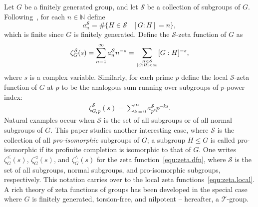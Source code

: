 \documentclass[11pt,a4paper]{amsart}
\theoremstyle{plain}
\theoremstyle{remark}
\newcommand{\N}{\mathbb{N}}
\begin{document}
Let $G$ be a finitely generated group, and let $\mathcal{S}$ be a collection of subgroups of $G$.  Following~\cite{GSS/88}, for each $n \in \N$ define 
\[a^{\mathcal{S}}_n=\#\{H\in \mathcal{S}\mid [G:H]=n\},\]
which is finite since $G$ is finitely generated. 
Define the $\mathcal{S}$-zeta function of $G$ as
\begin{align} \label{equ:zeta.dfn}
\zeta_G^\mathcal{S}(s)=\sum_{n=1}^\infty a^\mathcal{S}_n n^{-s} = \sum_{H \in \mathcal{S} \atop [G:H] < \infty} [G:H]^{-s},
\end{align}
where $s$ is a complex variable.  Similarly, for each prime $p$ define the local $\mathcal{S}$-zeta function of $G$ at $p$ to be the analogous sum running over subgroups of $p$-power index:
\begin{align} \label{equ:zeta.local}
\zeta_{G,p}^\mathcal{S}(s)=\sum_{k=0}^\infty a^\mathcal{S}_{p^k} p^{-ks}.
\end{align}
Natural examples occur when $\mathcal{S}$ is the set of all subgroups or of all normal subgroups of $G$.  This paper studies another interesting case, where $\mathcal{S}$ is the collection of all {\emph{pro-isomorphic}} subgroups of $G$; a subgroup $H \leq G$ is called pro-isomorphic if its profinite completion is isomorphic to that of $G$.  One writes $\zeta^\leq_G (s)$, $\zeta^\vartriangleleft_G (s)$, and $\zeta^\wedge_G (s)$ for the zeta function~\eqref{equ:zeta.dfn}, where $\mathcal{S}$ is the set of all subgroups, normal subgroups, and pro-isomorphic subgroups, respectively.  This notation carries over to the local zeta functions~\eqref{equ:zeta.local}.
A rich theory of zeta functions of groups has been developed in the special case where $G$ is finitely generated, torsion-free, and nilpotent -- hereafter, a $\mathcal{T}$-group.
\end{document}
